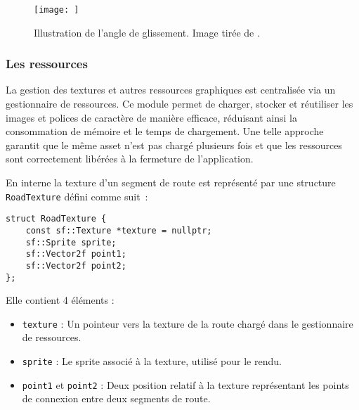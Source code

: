\begin{figure}[h]
\centering
\texttt{[image: ]}
\caption{Illustration de l'angle de glissement. Image tirée de \cite{fermi2023}.}
\label{fig:bicycle_model}
\end{figure}


\subsubsection{Les ressources}\label{subsubsec:gestion-des-ressources}
\label{subsubsubsec:gestionnaire-de-ressources}
La gestion des textures et autres ressources graphiques est centralisée via un gestionnaire de ressources.
Ce module permet de charger, stocker et réutiliser les images et polices de caractère de manière efficace, réduisant ainsi la consommation de mémoire et le temps de chargement.
Une telle approche garantit que le même asset n'est pas chargé plusieurs fois et que les ressources sont correctement libérées à la fermeture de l'application.

\label{subsubsubsec:connection-des-segment-de-routes}
En interne la texture d'un segment de route est représenté par une structure \texttt{RoadTexture} défini comme suit :

\begin{lstlisting}[style=CStyle,label={lst:struct_roadtexture}]
struct RoadTexture {
    const sf::Texture *texture = nullptr;
    sf::Sprite sprite;
    sf::Vector2f point1;
    sf::Vector2f point2;
};
\end{lstlisting}

Elle contient 4 éléments :
\begin{itemize}
    \item \texttt{texture} : Un pointeur vers la texture de la route chargé dans le gestionnaire de ressources.
    \item \texttt{sprite} : Le sprite associé à la texture, utilisé pour le rendu.
    \item \texttt{point1} et \texttt{point2} : Deux position relatif à la texture représentant les points de connexion entre deux segments de route.
\end{itemize}

